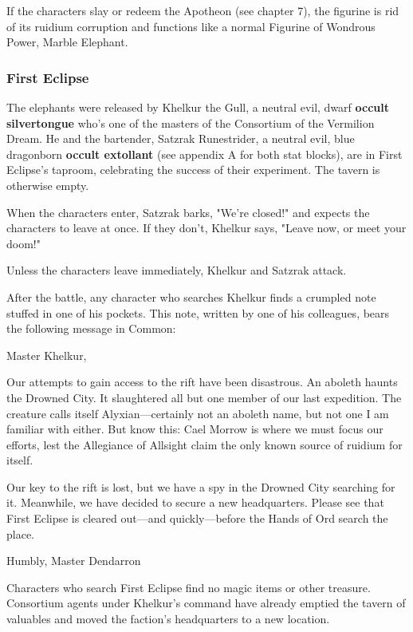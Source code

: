 \documentclass[10pt,a4paper,twoside,bg=print,twocolumn,openany,nodeprecatedcode]{dndbook}
\begin{document}
If the characters slay or redeem the Apotheon (see chapter 7), the figurine is rid of its ruidium corruption and functions like a normal Figurine of Wondrous Power, Marble Elephant.

\subsubsection{First Eclipse}
The elephants were released by Khelkur the Gull, a neutral evil, dwarf \textbf{occult silvertongue} who's one of the masters of the Consortium of the Vermilion Dream. He and the bartender, Satzrak Runestrider, a neutral evil, blue dragonborn \textbf{occult extollant} (see appendix A for both stat blocks), are in First Eclipse's taproom, celebrating the success of their experiment. The tavern is otherwise empty.

When the characters enter, Satzrak barks, "We're closed!" and expects the characters to leave at once. If they don't, Khelkur says, "Leave now, or meet your doom!"

Unless the characters leave immediately, Khelkur and Satzrak attack.

After the battle, any character who searches Khelkur finds a crumpled note stuffed in one of his pockets. This note, written by one of his colleagues, bears the following message in Common:

\begin{DndReadAloud}{}
Master Khelkur,

Our attempts to gain access to the rift have been disastrous. An aboleth haunts the Drowned City. It slaughtered all but one member of our last expedition. The creature calls itself Alyxian—certainly not an aboleth name, but not one I am familiar with either. But know this: Cael Morrow is where we must focus our efforts, lest the Allegiance of Allsight claim the only known source of ruidium for itself.

Our key to the rift is lost, but we have a spy in the Drowned City searching for it. Meanwhile, we have decided to secure a new headquarters. Please see that First Eclipse is cleared out—and quickly—before the Hands of Ord search the place.

Humbly, Master Dendarron

\end{DndReadAloud}

Characters who search First Eclipse find no magic items or other treasure. Consortium agents under Khelkur's command have already emptied the tavern of valuables and moved the faction's headquarters to a new location.
\end{document}
